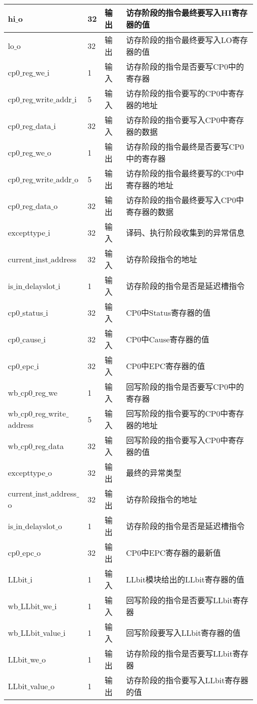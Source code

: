 \begin{table}[H]
\begin{tabular}{|l|l|l|l|}
		\hline
		hi$\_$o & 32 & 输出 & 访存阶段的指令最终要写入HI寄存器的值 \\
		\hline
		lo$\_$o & 32 & 输出 & 访存阶段的指令最终要写入LO寄存器的值 \\
		\hline
		cp0$\_$reg$\_$we$\_$i & 1 & 输入 & 访存阶段的指令是否要写CP0中的寄存器 \\
		\hline
		cp0$\_$reg$\_$write$\_$addr$\_$i & 5 & 输入 & 访存阶段的指令要写的CP0中寄存器的地址 \\
		\hline
		cp0$\_$reg$\_$data$\_$i & 32 & 输入 & 访存阶段的指令要写入CP0中寄存器的数据 \\
		\hline
		cp0$\_$reg$\_$we$\_$o & 1 & 输出 & 访存阶段的指令最终是否要写CP0中的寄存器 \\
		\hline
		cp0$\_$reg$\_$write$\_$addr$\_$o & 5 & 输出 & 访存阶段的指令最终要写的CP0中寄存器的地址 \\
		\hline
		cp0$\_$reg$\_$data$\_$o & 32 & 输出 & 访存阶段的指令最终要写入CP0中寄存器的数据 \\
		\hline
		excepttype$\_$i & 32 & 输入 & 译码、执行阶段收集到的异常信息 \\
		\hline
		current$\_$inst$\_$address & 32 & 输入 & 访存阶段指令的地址 \\
		\hline
		is$\_$in$\_$delayslot$\_$i & 1 & 输入 & 访存阶段的指令是否是延迟槽指令 \\
		\hline
		cp0$\_$status$\_$i & 32 & 输入 & CP0中Status寄存器的值 \\
		\hline
		cp0$\_$cause$\_$i & 32 & 输入 & CP0中Cause寄存器的值 \\
		\hline
		cp0$\_$epc$\_$i & 32 & 输入 & CP0中EPC寄存器的值 \\
		\hline
		wb$\_$cp0$\_$reg$\_$we & 1 & 输入 & 回写阶段的指令是否要写CP0中的寄存器 \\
		\hline
		wb$\_$cp0$\_$reg$\_$write$\_$address & 5 & 输入 & 回写阶段的指令要写的CP0中寄存器的地址 \\
		\hline
		wb$\_$cp0$\_$reg$\_$data & 32 & 输入 & 回写阶段的指令要写入CP0中寄存器的值 \\
		\hline
		excepttype$\_$o & 32 & 输出 & 最终的异常类型 \\
		\hline
		current$\_$inst$\_$address$\_$o & 32 & 输出 & 访存阶段指令的地址 \\
		\hline
		is$\_$in$\_$delayslot$\_$o & 1 & 输出 & 访存阶段的指令是否是延迟槽指令 \\
		\hline
		cp0$\_$epc$\_$o & 32 & 输出 & CP0中EPC寄存器的最新值 \\
		\hline
		LLbit$\_$i & 1 & 输入 & LLbit模块给出的LLbit寄存器的值 \\
		\hline
		wb$\_$LLbit$\_$we$\_$i & 1 & 输入 & 回写阶段的指令是否要写LLbit寄存器 \\
		\hline
		wb$\_$LLbit$\_$value$\_$i & 1 & 输入 & 回写阶段要写入LLbit寄存器的值 \\
		\hline
		LLbit$\_$we$\_$o & 1 & 输出 & 访存阶段的指令是否要写LLbit寄存器 \\
		\hline
		LLbit$\_$value$\_$o & 1 & 输出 & 访存阶段的指令要写入LLbit寄存器的值 \\
		\hline
	\end{tabular}
\end{table}
